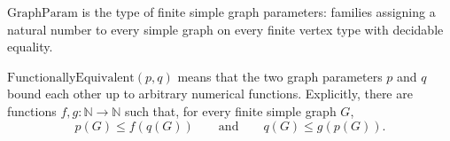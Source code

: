 \(\mathrm{GraphParam}\) is the type of finite simple graph parameters:
families assigning a natural number to every simple graph on every finite vertex
type with decidable equality.

\(\mathrm{FunctionallyEquivalent}(p,q)\) means that the two graph parameters
\(p\) and \(q\) bound each other up to arbitrary numerical functions.  Explicitly,
there are functions \(f,g:\mathbb{N}\to\mathbb{N}\) such that, for every finite
simple graph \(G\),
\[
  p(G)\le f(q(G))
  \qquad\text{and}\qquad
  q(G)\le g(p(G)).
\]

